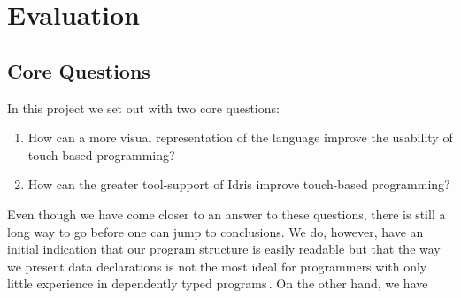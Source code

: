 \section{Evaluation}
\label{sec:Evaluation}



\subsection{Core Questions}
In this project we set out with two core questions:

\begin{enumerate}
	\item How can a more visual representation of the language improve the usability of touch-based programming?
	\item How can the greater tool-support of Idris improve touch-based programming?
\end{enumerate}

Even though we have come closer to an answer to these questions, there is still
a long way to go before one can jump to conclusions. We do, however, have an
initial indication that our program structure is easily readable but that the
way we present data declarations is not the most ideal for programmers with
only little experience in dependently typed programs\,. On the other hand, we
have 

